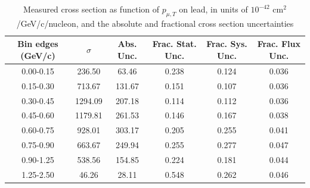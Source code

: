 \documentclass[../main.tex]{subfiles}
\begin{document}
\begin{table}
  \centering
  \renewcommand{\arraystretch}{1.15}
  \caption{Systematic covariance matrix of measured cross section in $p_{\mu,||}$ on lead, in units of $10^{-84}$ $(\text{cm}^2$/GeV/c/nucleon$)^2$}
  \label{tbl:sysnucleonnuc82muon_pzc}
\end{table}
\pagebreak
\begin{turnpage}
\end{turnpage}
\begin{table}
  \centering
  \renewcommand{\arraystretch}{1.15}
  \caption{Measured cross section as function of $p_{\mu,T}$ on lead, in units of $10^{-42}$ $\text{cm}^2$/GeV/c/nucleon, and the absolute and fractional cross section uncertainties}
    \begin{tabular}{c||c|c||c|c|c}
      Bin edges (GeV/c) &  $\sigma$  &  Abs. Unc.  &  Frac. Stat. Unc.  &  Frac. Sys. Unc.  &  Frac. Flux Unc. \\
      \hline
      \hline
      0.00-0.15 & 236.50 & 63.46 & 0.238 & 0.124 & 0.036\\
      0.15-0.30 & 713.67 & 131.67 & 0.151 & 0.107 & 0.036\\
      0.30-0.45 & 1294.09 & 207.18 & 0.114 & 0.112 & 0.036\\
      0.45-0.60 & 1179.81 & 261.53 & 0.146 & 0.167 & 0.038\\
      0.60-0.75 & 928.01 & 303.17 & 0.205 & 0.255 & 0.041\\
      0.75-0.90 & 663.67 & 249.94 & 0.255 & 0.277 & 0.047\\
      0.90-1.25 & 538.56 & 154.85 & 0.224 & 0.181 & 0.044\\
      1.25-2.50 & 46.26 & 28.11 & 0.548 & 0.262 & 0.046
    \end{tabular}
  \label{tbl:datanucleonnuc82muon_pta}
\end{table}
\end{document}
